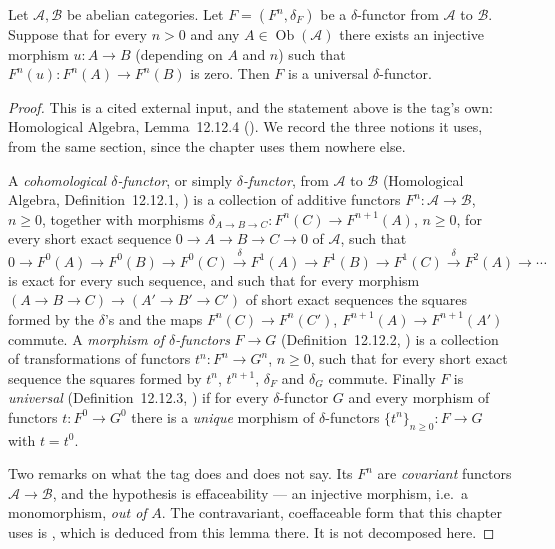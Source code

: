 \begin{lemma}
\label{lem:pc-effaceable-universal}
Let $\mathcal A,\mathcal B$ be abelian categories.  Let
$F=(F^n,\delta_F)$ be a $\delta$-functor from $\mathcal A$ to
$\mathcal B$.  Suppose that for every $n>0$ and any
$A\in\operatorname{Ob}(\mathcal A)$ there exists an injective
morphism $u:A\to B$ (depending on $A$ and $n$) such that
$F^n(u):F^n(A)\to F^n(B)$ is zero.  Then $F$ is a universal
$\delta$-functor.
\end{lemma}
\begin{proof}
This is a cited external input, and the statement above is the tag's
own: Homological Algebra, Lemma~12.12.4 ().  We
record the three notions it uses, from the same section, since the
chapter uses them nowhere else.

A \emph{cohomological $\delta$-functor}, or simply
\emph{$\delta$-functor}, from $\mathcal A$ to $\mathcal B$
(Homological Algebra, Definition~12.12.1, ) is a
collection of additive functors $F^n:\mathcal A\to\mathcal B$,
$n\ge0$, together with morphisms
$\delta_{A\to B\to C}:F^n(C)\to F^{n+1}(A)$, $n\ge0$, for every short
exact sequence $0\to A\to B\to C\to0$ of $\mathcal A$, such that
\[
0\to F^0(A)\to F^0(B)\to F^0(C)\xrightarrow{\ \delta\ }
F^1(A)\to F^1(B)\to F^1(C)\xrightarrow{\ \delta\ }F^2(A)\to\cdots
\]
is exact for every such sequence, and such that for every morphism
$(A\to B\to C)\to(A'\to B'\to C')$ of short exact sequences the
squares formed by the $\delta$'s and the maps $F^n(C)\to F^n(C')$,
$F^{n+1}(A)\to F^{n+1}(A')$ commute.  A \emph{morphism of
$\delta$-functors} $F\to G$ (Definition~12.12.2,
) is a collection of transformations of functors
$t^n:F^n\to G^n$, $n\ge0$, such that for every short exact sequence
the squares formed by $t^n$, $t^{n+1}$, $\delta_F$ and $\delta_G$
commute.  Finally $F$ is \emph{universal} (Definition~12.12.3,
) if for every $\delta$-functor $G$ and every
morphism of functors $t:F^0\to G^0$ there is a \emph{unique} morphism
of $\delta$-functors $\{t^n\}_{n\ge0}:F\to G$ with $t=t^0$.

Two remarks on what the tag does and does not say.  Its $F^n$ are
\emph{covariant} functors $\mathcal A\to\mathcal B$, and the
hypothesis is effaceability --- an injective morphism, i.e.\ a
monomorphism, \emph{out of} $A$.  The contravariant, coeffaceable
form that this chapter uses is
, which is deduced from this
lemma there.  It is not decomposed here.
\end{proof}

